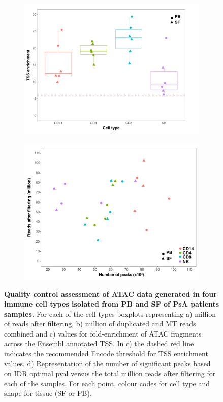 \begin{figure}[H]
\begin{subfigure}[b]{0.48\textwidth}
\includegraphics[width=\textwidth]{./Results3/pdfs/ATAC_PSA_all_TSS_max_per_cell_type}%
\caption{}
\end{subfigure}
\begin{subfigure}[b]{0.48\textwidth} 
\centering
\includegraphics[width=\textwidth]{./Results3/pdfs/ATAC_PSA_all_peaks_vs_num_reads}%
\caption{}
\end{subfigure}
\caption[Quality control assessment of ATAC data generated in four immune cell types isolated from PB and SF of PsA patients samples.]{\textbf{Quality control assessment of ATAC data generated in four immune cell types isolated from PB and SF of PsA patients samples.} For each of the cell types boxplots representing a) million of reads after filtering, b) million of duplicated and MT reads combined and c) values for fold-enrichment of ATAC fragments across the Ensembl annotated TSS. In c) the dashed red line indicates the recommended Encode threshold for TSS enrichment values. d) Representation of the  number of significant peaks based on IDR optimal pval versus the total million reads after filtering for each of the samples. For each point, colour codes for cell type and shape for tissue (SF or PB).}
\label{figure:PsA_FAST_ATAC_QC}
\end{figure}


